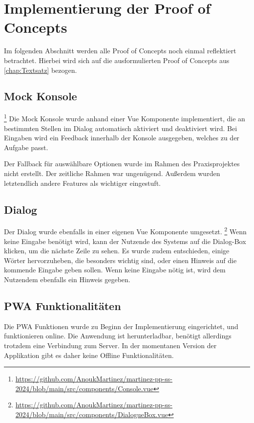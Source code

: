 \begin{description}
\end{description}

\section{Implementierung der Proof of Concepts}
Im folgenden Abschnitt werden alle Proof of Concepts noch einmal reflektiert betrachtet. Hierbei wird sich auf die ausformulierten Proof of Concepts aus \cref{chap:Textsatz} bezogen.
\subsection{Mock Konsole} \footnote{\url{https://github.com/AnoukMartinez/martinez-pp-ss-2024/blob/main/src/components/Console.vue}}
Die Mock Konsole wurde anhand einer Vue Komponente implementiert, die an bestimmten Stellen im Dialog automatisch aktiviert und deaktiviert wird. Bei Eingaben wird ein Feedback innerhalb der Konsole ausgegeben, welches zu der Aufgabe passt.

Der Fallback für auswählbare Optionen wurde im Rahmen des Praxisprojektes nicht erstellt. Der zeitliche Rahmen war ungenügend. Außerdem wurden letztendlich andere Features als wichtiger eingestuft.

\subsection{Dialog}
Der Dialog wurde ebenfalls in einer eigenen Vue Komponente umgesetzt. \footnote{\url{https://github.com/AnoukMartinez/martinez-pp-ss-2024/blob/main/src/components/DialogueBox.vue}}
Wenn keine Eingabe benötigt wird, kann der Nutzende des Systems auf die Dialog-Box klicken, um die nächste Zeile zu sehen.
Es wurde zudem entschieden, einige Wörter hervorzuheben, die besonders wichtig sind, oder einen Hinweis auf die kommende Eingabe geben sollen.
Wenn keine Eingabe nötig ist, wird dem Nutzendem ebenfalls ein Hinweis gegeben.

\subsection{PWA Funktionalitäten}
Die PWA Funktionen wurde zu Beginn der Implementierung eingerichtet, und funktionieren online. Die Anwendung ist herunterladbar, benötigt allerdings trotzdem eine Verbindung zum Server.
In der momentanen Version der Applikation gibt es daher keine Offline Funktionalitäten.
